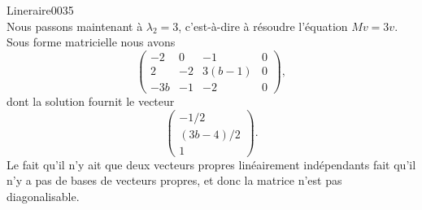 \begin{corrige}{Lineraire0035}
\begin{equation}
	\end{equation}
	Nous passons maintenant à $\lambda_2=3$, c'est-à-dire à résoudre l'équation $Mv=3v$. Sous forme matricielle nous avons
	\begin{equation}
		\left(\begin{array}{ccc|c}
			 -2	&	0	&	-1	&	0	\\
			  2	&	-2	&	3(b-1)	&	0\\
			   -3b	&	-1	&	-2	&	0	 
		   \end{array}\right),
	\end{equation}
	dont la solution fournit le vecteur
	\begin{equation}
		\begin{pmatrix}
			-1/2	\\ 
			(3b-4)/2	\\ 
			1	
		\end{pmatrix}.
	\end{equation}
	Le fait qu'il n'y ait que deux vecteurs propres linéairement indépendants fait qu'il n'y a pas de bases de vecteurs propres, et donc la matrice n'est pas diagonalisable.

\end{corrige}
